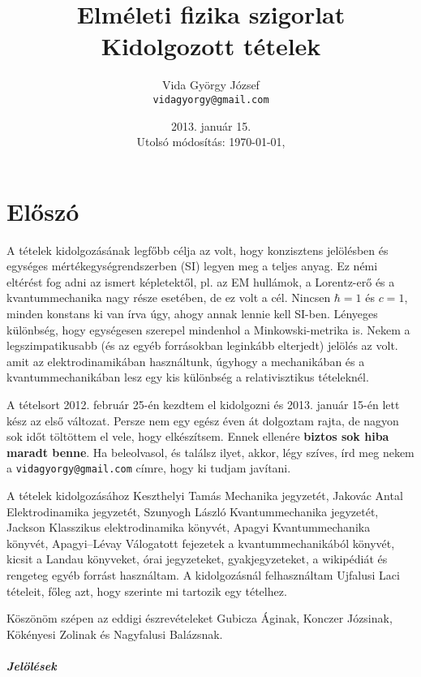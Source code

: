 \documentclass[a4paper,11pt,oneside,titlepage]{book}
\author{Vida Gy\"orgy J\'ozsef\\ \texttt{vidagyorgy@gmail.com}}
\title{Elm\'eleti fizika szigorlat \\ Kidolgozott t\'etelek}
\date{2013. január 15. \\ Utolsó módosítás: \today, \currenttime}
\begin{document}
 \maketitle
%  
 \chapter*{El\H{o}sz\'o}
  
  A tételek kidolgozásának legfőbb célja az volt, hogy konzisztens jelölésben és egységes mértékegységrendszerben (SI) legyen meg a teljes anyag. Ez némi eltérést fog adni az ismert képletektől, pl. az EM hullámok, a Lorentz-erő és a kvantummechanika nagy része esetében, de ez volt a cél. Nincsen $\hbar=1$ és $c=1$, minden konstans ki van írva úgy, ahogy annak lennie kell SI-ben. Lényeges különbség, hogy egységesen szerepel mindenhol a Minkowski-metrika is. Nekem a legszimpatikusabb (és az egyéb forrásokban leginkább elterjedt) jelölés az volt. amit az elektrodinamikában használtunk, úgyhogy a mechanikában és a kvantummechanikában lesz egy kis különbség a relativisztikus tételeknél.
  
  A tételsort 2012. február 25-én kezdtem el kidolgozni és 2013. január 15-én lett kész az első változat. Persze nem egy egész éven át dolgoztam rajta, de nagyon sok időt töltöttem el vele, hogy elkészítsem. Ennek ellenére {\bf \color{red} biztos sok hiba maradt benne}. Ha beleolvasol, és találsz ilyet, akkor, légy szíves, írd meg nekem a \texttt{vidagyorgy@gmail.com} címre, hogy ki tudjam javítani. 
  
  A tételek kidolgozásához Keszthelyi Tamás Mechanika jegyzetét, Jakovác Antal Elektrodinamika jegyzetét, Szunyogh László Kvantummechanika jegyzetét, Jackson Klasszikus elektrodinamika könyvét, Apagyi Kvantummechanika könyvét, Apagyi--Lévay Válogatott fejezetek a kvantummechanikából könyvét, kicsit a Landau könyveket, órai jegyzeteket, gyakjegyzeteket, a wikipédiát és rengeteg egyéb forrást használtam. A kidolgozásnál felhasználtam Ujfalusi Laci tételeit, főleg azt, hogy szerinte mi tartozik egy tételhez.
  
  Köszönöm szépen az eddigi észrevételeket Gubicza Áginak, Konczer Józsinak, Kökényesi Zolinak és Nagyfalusi Balázsnak.
  
  \paragraph{Jelölések}
  
\end{document}
